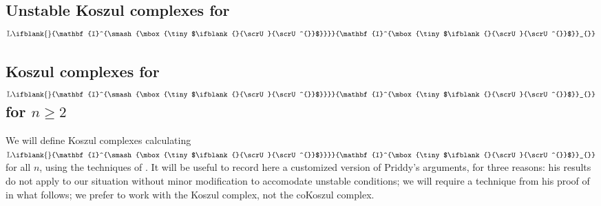 \documentclass[10pt]{article}
\newcommand{\LL}[1]{\ifblank{#1}{\scrK}{\scrK^{#1}}}
\newcommand{\nontop}[1]{\ifblank{#1}{\scrU}{\scrU^{#1}}}
\newcommand{\Ind}[2][]{\ifblank{#1}{\mathbf{I}^{\smash{\mbox{\tiny $#2$}}}}{\mathbf{I}^{\mbox{\tiny $#2$}}_{#1}}}%
\newcommand{\derived}{\mathbb{L}}
\renewcommand{\Q}{Q}
\newcommand{\minDim}{m}
\begin{document}
\begin{KoszulComplexes_n>1}
\pagebreak
\section{Unstable Koszul complexes for $\derived\Ind{\nontop{}}$} \label{sectionOnUnstableKoszulComplexes}
\subsection{Koszul complexes for $\derived\Ind{\nontop{}}$ for $n\geq2$}
We will define Koszul complexes calculating $\derived\Ind{\nontop{}}$ for all $n$, using the techniques of \cite{PriddyKoszul.pdf}. It will be useful to record here a customized version of Priddy's arguments, for three reasons: his results do not apply to our situation without minor modification to accomodate unstable conditions; we will require a technique from his proof of \cite[Thm 5.3]{PriddyKoszul.pdf} in what follows; we prefer to work with the Koszul complex, not the coKoszul complex.



\end{KoszulComplexes_n>1}
\end{document}
